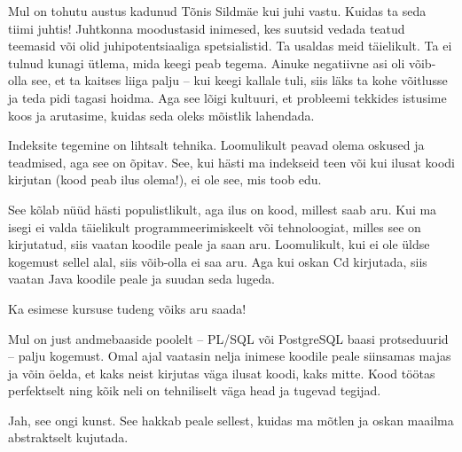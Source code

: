 Mul on tohutu austus kadunud Tõnis Sildmäe kui juhi 
vastu. Kuidas ta seda tiimi juhtis! Juhtkonna moodustasid inimesed, kes suutsid 
vedada teatud teemasid või olid juhipotentsiaaliga spetsialistid. Ta 
usaldas meid täielikult. Ta ei tulnud kunagi ütlema, mida keegi peab tegema. 
Ainuke negatiivne asi oli võib-olla see, et ta kaitses liiga palju -- kui 
keegi kallale tuli, siis läks ta kohe võitlusse ja teda pidi tagasi 
hoidma. Aga see lõigi kultuuri, et probleemi tekkides istusime koos
ja arutasime, kuidas seda oleks mõistlik lahendada. 


Indeksite tegemine on lihtsalt tehnika. Loomulikult peavad olema 
oskused ja teadmised, aga see on õpitav. See, kui 
hästi ma indekseid teen või kui ilusat koodi kirjutan (kood peab ilus 
olema!), ei ole see, mis toob edu. 


See kõlab nüüd hästi populistlikult, aga ilus on kood, millest saab aru. Kui ma isegi ei valda täielikult programmeerimiskeelt või 
tehnoloogiat, milles see on kirjutatud, siis vaatan koodile peale ja saan aru. 
Loomulikult, kui ei ole üldse kogemust sellel alal, siis 
võib-olla ei saa aru. Aga kui oskan Cd kirjutada, siis vaatan Java koodile 
peale ja suudan seda lugeda. 


Ka esimese kursuse tudeng võiks aru saada!

Mul on just andmebaaside poolelt -- PL/SQL või PostgreSQL baasi protseduurid -- palju kogemust. Omal ajal vaatasin nelja inimese 
koodile peale siinsamas majas ja võin öelda, et kaks neist kirjutas väga ilusat koodi, kaks mitte. 
Kood töötas perfektselt ning kõik neli on tehniliselt väga head ja tugevad tegijad. 


Jah, see ongi kunst. See hakkab peale sellest, kuidas ma mõtlen ja 
oskan maailma abstraktselt kujutada. 


